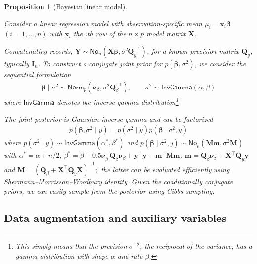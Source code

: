 \documentclass[
  11pt,
  letterpaper,
]{scrbook}
\theoremstyle{definition}
\theoremstyle{definition}
\theoremstyle{definition}
\theoremstyle{plain}
\newtheorem{proposition}{Proposition}[chapter]
\theoremstyle{remark}
\begin{document}
\begin{proposition}[Bayesian linear
model]\protect\hypertarget{prp-conjugate-bayesian-linmod}{}\label{prp-conjugate-bayesian-linmod}

Consider a linear regression model with observation-specific mean
\(\mu_i = \mathbf{x}_i\boldsymbol{\beta}\) \((i=1,\ldots, n)\) with
\(\mathbf{x}_i\) the \(i\)th row of the \(n \times p\) model matrix
\(\mathbf{X}\).

Concatenating records,
\(\boldsymbol{Y} \sim \mathsf{No}_n(\mathbf{X}\boldsymbol{\beta}, \sigma^2 \mathbf{Q}_y^{-1})\),
for a known precision matrix \(\mathbf{Q}_y\), typically
\(\mathbf{I}_n\). To construct a conjugate joint prior for
\(p(\boldsymbol{\beta}, \sigma^2)\), we consider the sequential
formulation \begin{align*}
\boldsymbol{\beta} \mid \sigma^2 \sim \mathsf{Norm}_p(\boldsymbol{\nu}_\beta, \sigma^2 \mathbf{Q}^{-1}_\beta), \qquad \sigma^2 \sim \mathsf{InvGamma}(\alpha,\beta)
\end{align*} where \(\mathsf{InvGamma}\) denotes the inverse gamma
distribution\footnote{This simply means that the precision
  \(\sigma^{-2}\), the reciprocal of the variance, has a gamma
  distribution with shape \(\alpha\) and rate \(\beta\).}

The joint posterior is Gaussian-inverse gamma and can be factorized
\begin{align*}
p(\boldsymbol{\beta}, \sigma^2 \mid y) = p(\sigma^2 \mid y) p(\boldsymbol{\beta} \mid \sigma^2, y)
\end{align*} where
\(p(\sigma^2 \mid y) \sim \mathsf{InvGamma}(\alpha^*, \beta^*)\) and
\(p(\boldsymbol{\beta} \mid \sigma^2, y) \sim \mathsf{No}_p(\mathbf{M}\boldsymbol{m}, \sigma^2\mathbf{M})\)
with \(\alpha^* = \alpha + n/2\),
\(\beta^*=\beta + 0.5 \boldsymbol{\nu}_\beta^\top \mathbf{Q}_\beta\boldsymbol{\nu}_\beta + \boldsymbol{y}^\top\boldsymbol{y} - \boldsymbol{m}^\top\mathbf{M}\boldsymbol{m}\),
\(\boldsymbol{m} = \mathbf{Q}_\beta \boldsymbol{\nu}_\beta + \mathbf{X}^\top \mathbf{Q}_y\boldsymbol{y}\)
and
\(\mathbf{M} = (\mathbf{Q}_\beta + \mathbf{X}^\top\mathbf{Q}_y\mathbf{X})^{-1};\)
the latter can be evaluated efficiently using
Shermann--Morrisson--Woodbury identity. Given the conditionally
conjugate priors, we can easily sample from the posterior using Gibbs
sampling.

\end{proposition}

\hypertarget{data-augmentation-and-auxiliary-variables}{%
\subsection{Data augmentation and auxiliary
variables}\label{data-augmentation-and-auxiliary-variables}}
\end{document}
